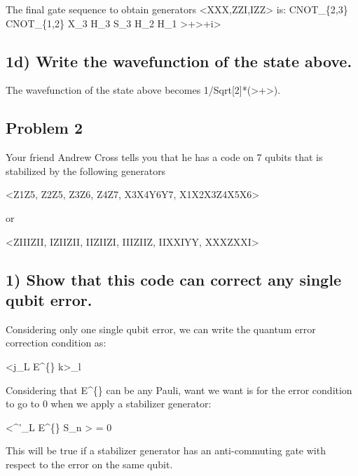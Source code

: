 \documentclass[11pt]{article}
\begin{document}
The final gate sequence to obtain generators
\textless XXX,ZZI,IZZ\textgreater{} is: CNOT\_\{2,3\} CNOT\_\{1,2\} X\_3
H\_3 S\_3 H\_2 H\_1
\textgreater\textbar+\textgreater\textbar+i\textgreater{}

    \hypertarget{d-write-the-wavefunction-of-the-state-above.}{%
\subsection{1d) Write the wavefunction of the state
above.}\label{d-write-the-wavefunction-of-the-state-above.}}

    The wavefunction of the state above becomes
1/Sqrt{[}2{]}*(\textgreater+\textgreater).

    \hypertarget{problem-2}{%
\subsection{Problem 2}\label{problem-2}}

Your friend Andrew Cross tells you that he has a code on 7 qubits that
is stabilized by the following generators

\textless Z1Z5, Z2Z5, Z3Z6, Z4Z7, X3X4Y6Y7, X1X2X3Z4X5X6\textgreater{}

or

\textless ZIIIZII, IZIIZII, IIZIIZI, IIIZIIZ, IIXXIYY,
XXXZXXI\textgreater{}

    \hypertarget{show-that-this-code-can-correct-any-single-qubit-error.}{%
\subsection{1) Show that this code can correct any single qubit
error.}\label{show-that-this-code-can-correct-any-single-qubit-error.}}

    Considering only one single qubit error, we can write the quantum error
correction condition as:

\textless j\textbar\_L E\^{}\{\dagger\} \textbar k\textgreater\_l

Considering that E\^{}\{\dagger\} can be any Pauli, want we want is for
the error condition to go to 0 when we apply a stabilizer generator:

\textless{}\phi\^{}'\textbar\_L E\^{}\{\dagger\} S\_n
\textbar{}\phi\textgreater{} = 0

This will be true if a stabilizer generator has an anti-commuting gate
with respect to the error on the same qubit.
\end{document}
